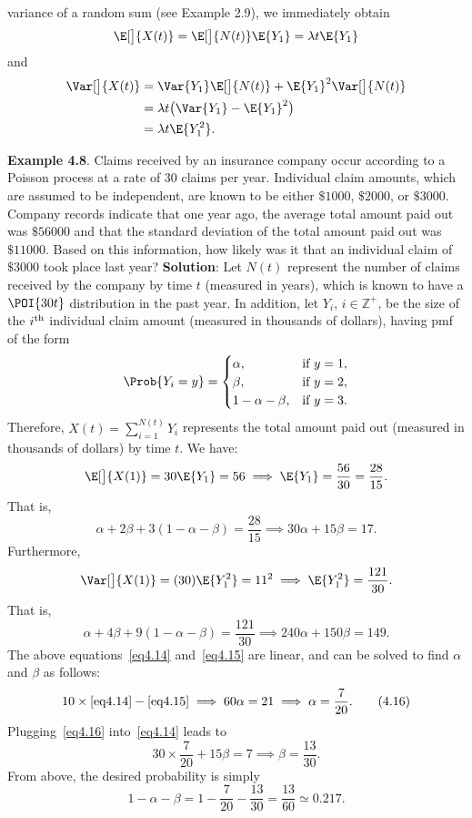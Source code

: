 \begin{Regular}
\begin{enumerate}[(1)]
              variance of a random sum (see Example 2.9), we immediately obtain
              \[ \E[\big]{X(t)}=\E[\big]{N(t)}\E{Y_1}=\lambda t\E{Y_1} \]
              and
              \begin{align*}
                  \Var[\big]{X(t)}
                   & =\Var{Y_1}\E[\big]{N(t)}+\E{Y_1}^2\Var[\big]{N(t)} \\
                   & =\lambda t\bigl(\Var{Y_1}-\E{Y_1}^2\bigr)          \\
                   & =\lambda t\E{Y_1^2}.
              \end{align*}
    \end{enumerate}
\end{Regular}
\begin{Example}
    \textbf{Example 4.8}. Claims received by an insurance company occur according to a Poisson process
    at a rate of $30$ claims per year. Individual claim amounts, which are assumed to be
    independent, are known to be either $\$1000$, $\$2000$, or $\$3000$. Company records indicate that
        one year ago, the average total amount paid out was $\$56000$ and that the standard deviation
        of the total amount paid out was $\$11000$. Based on this information, how likely was it that an
        individual claim of $\$3000$ took place last year?
        \tcblower{}
        \textbf{Solution}: Let $ N(t) $ represent the number of claims received by the company
        by time $ t $ (measured in years), which is known to have a $ \POI{30t} $
        distribution in the past year. In addition, let $ Y_i $, $ i\in\mathbb{Z}^+ $,
        be the size of the $ i\textsuperscript{th} $ individual claim amount (measured in thousands of dollars),
        having pmf of the form
        \[ \Prob{Y_i=y}=\begin{cases}
                \alpha,         & \text{if $y=1$}, \\
                \beta,          & \text{if $y=2$}, \\
                1-\alpha-\beta, & \text{if $y=3$}.
            \end{cases} \]
        Therefore, $ X(t)=\sum_{i=1}^{N(t)}Y_i $ represents the total amount paid out (measured in thousands of dollars) by time $ t $.
        We have:
        \[ \E[\big]{X(1)}=30\E{Y_1}=56\implies \E{Y_1}=\frac{56}{30}=\frac{28}{15}. \]
        That is,
        \[ \alpha+2\beta+3(1-\alpha-\beta)=\frac{28}{15}\implies 30\alpha+15\beta=17.\label{eq4.14}\tag*{(4.14)} \]
        Furthermore,
        \[ \Var[\big]{X(1)}=(30)\E{Y_1^2}=11^2\implies \E{Y_1^2}=\frac{121}{30}. \]
        That is,
        \[ \alpha+4\beta+9(1-\alpha-\beta)=\frac{121}{30}\implies 240\alpha+150\beta=149.\label{eq4.15}\tag*{(4.15)} \]
        The above equations~\ref{eq4.14} and~\ref{eq4.15} are linear, and can be solved to find $ \alpha $ and $ \beta $ as follows:
    \[ 10\times\ref{eq4.14}-\ref{eq4.15}\implies 60\alpha=21\implies \alpha=\frac{7}{20}.\label{eq4.16}\tag*{(4.16)} \]
    Plugging~\ref{eq4.16} into~\ref{eq4.14} leads to
    \[ 30\times \frac{7}{20}+15\beta=7\implies \beta=\frac{13}{30}. \]
    From above, the desired probability is simply
    \[ 1-\alpha-\beta=1-\frac{7}{20}-\frac{13}{30}=\frac{13}{60}\simeq 0.217. \]
\end{Example}